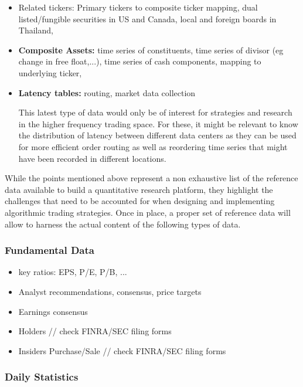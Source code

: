 \begin{itemize}
\item Related tickers: Primary tickers to composite ticker mapping, dual listed/fungible securities in US and Canada, local and foreign boards in Thailand, 

\item \textbf{Composite Assets:} time series of constituents, time series of divisor (eg change in free float,...), time series of cash components, mapping to underlying ticker, 

\item \textbf{Latency tables:} routing, market data collection

This latest type of data would only be of interest for strategies and research in the higher frequency trading space. For these, it might be relevant to know the distribution of latency between different data centers as they can be used for more efficient order routing as well as reordering time series that might have been recorded in different locations.

\end{itemize}

While the points mentioned above represent a non exhaustive list of the reference data available to build a quantitative research platform, they highlight the challenges that need to be accounted for when designing and implementing algorithmic trading strategies. Once in place, a proper set of reference data will allow to harness the actual content of the following types of data.

\subsubsection{Fundamental Data}

\begin{itemize}
\item key ratios: EPS, P/E, P/B, ...
\item Analyst recommendations, consensus, price targets
\item Earnings consensus
\item Holders // check FINRA/SEC filing forms
\item Insiders Purchase/Sale // check FINRA/SEC filing forms
\end{itemize}

\subsubsection{Daily Statistics}


